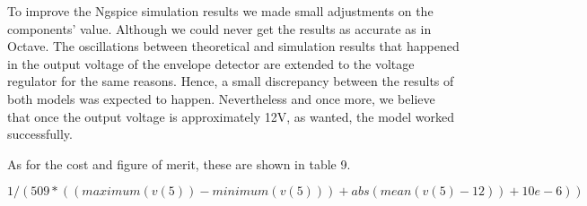 To improve the Ngspice simulation results we made small adjustments on the components' value. Although we could never get the results as accurate as in Octave. 
The oscillations between theoretical and simulation results that happened in the output voltage of the envelope detector are extended to the voltage regulator for the same reasons. Hence, a small discrepancy between the results of both models was expected to happen. Nevertheless and once more, we believe that once the output voltage is approximately 12V, as wanted, the model worked successfully.

As for the cost and figure of merit, these are shown in table 9.

\begin{equation}
    1/ (509* ((maximum(v(5))-minimum(v(5))) + abs(mean(v(5)-12)) + 10e-6))
\end{equation}




